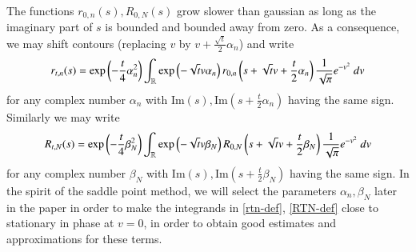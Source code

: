The functions $r_{0,n}(s), R_{0,N}(s)$ grow slower than gaussian as long as the imaginary part of $s$ is bounded and bounded away from zero.  As a consequence, we may shift contours (replacing $v$ by $v + \frac{\sqrt{t}}{2} \alpha_n$) and write
\begin{equation}\label{rtn-def}
 r_{t,n}(s) = \exp\left( - \frac{t}{4} \alpha_n^2\right) \int_{\mathbb{R}} \exp\left( - \sqrt{t} v \alpha_n\right) r_{0,n}\left( s + \sqrt{t} v + \frac{t}{2} \alpha_n\right) \frac{1}{\sqrt{\pi}} e^{-v^2}\ dv
\end{equation}
for any complex number $\alpha_n$ with $\mathrm{Im}(s), \mathrm{Im}(s + \frac{t}{2} \alpha_n)$ having the same sign.  Similarly we may write
\begin{equation}\label{RTN-def}
 R_{t,N}(s) = \exp\left( - \frac{t}{4} \beta_N^2\right) \int_{\mathbb{R}} \exp\left( - \sqrt{t} v \beta_N\right) R_{0,N}\left( s + \sqrt{t} v + \frac{t}{2} \beta_N\right) \frac{1}{\sqrt{\pi}} e^{-v^2}\ dv
\end{equation}
for any complex number $\beta_N$ with $\mathrm{Im}(s), \mathrm{Im}(s + \frac{t}{2} \beta_N)$ having the same sign.  In the spirit of the saddle point method, we will select the parameters $\alpha_n, \beta_N$ later in the paper in order to make the integrands in \eqref{rtn-def}, \eqref{RTN-def} close to stationary in phase at $v=0$, in order to obtain good estimates and approximations for these terms.




